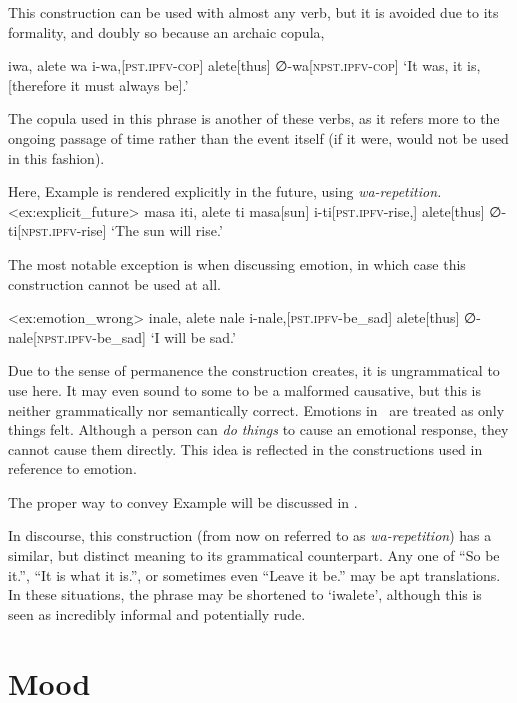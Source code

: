 This construction can be used with almost any verb, but it is avoided due to its formality, and doubly so because an archaic copula, 

\ex
\begingl
\glpreamble iwa, alete wa
\endpreamble
i-wa,[\textsc{pst.ipfv-cop}]
alete[thus]
∅-wa[\textsc{npst.ipfv-cop}]
\glft `It was, it is, [therefore it must always be].'
\endgl
\xe

The copula used in this phrase is another of these verbs, as it refers more to the ongoing passage of time rather than the event itself (if it were,  would not be used in this fashion).


Here, Example  is rendered explicitly in the future, using \textit{wa-repetition.}
\ex<ex:explicit_future>
\begingl
\glpreamble masa iti, alete ti
\endpreamble
masa[sun]
i-ti[\textsc{pst.ipfv-}rise,]
alete[thus]
∅-ti[\textsc{npst.ipfv-}rise]
\glft `The sun will rise.'
\endgl
\xe

The most notable exception is when discussing emotion, in which case this construction cannot be used at all.

\ex<ex:emotion_wrong>
\begingl
\glpreamble \ljudge{*} inale, alete nale
\endpreamble
i-nale,[\textsc{pst.ipfv-}be\_sad]
alete[thus]
∅-nale[\textsc{npst.ipfv-}be\_sad]
\glft `I will be sad.'
\endgl
\xe

Due to the sense of permanence the construction creates, it is ungrammatical to use here. It may even sound to some to be a malformed causative, but this is neither grammatically nor semantically correct. Emotions in \langname\ are treated as only things felt. Although a person can \textit{do things} to cause an emotional response, they cannot cause them directly. This idea is reflected in the constructions used in reference to emotion.

The proper way to convey Example  will be discussed in .

In discourse, this construction (from now on referred to as \textit{wa-repetition}) has a similar, but distinct meaning to its grammatical counterpart. Any one of ``So be it.'', ``It is what it is.'', or sometimes even ``Leave it be.'' may be apt translations. In these situations, the phrase may be shortened to `iwalete', although this is seen as incredibly informal and potentially rude.

\section{Mood}
